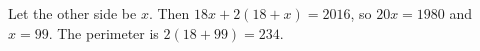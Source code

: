 Let the other side be $x$. Then $18x+2(18+x)=2016$, so $20x=1980$ and $x=99$. The perimeter is $2(18+99)=\boxed{234}$.
